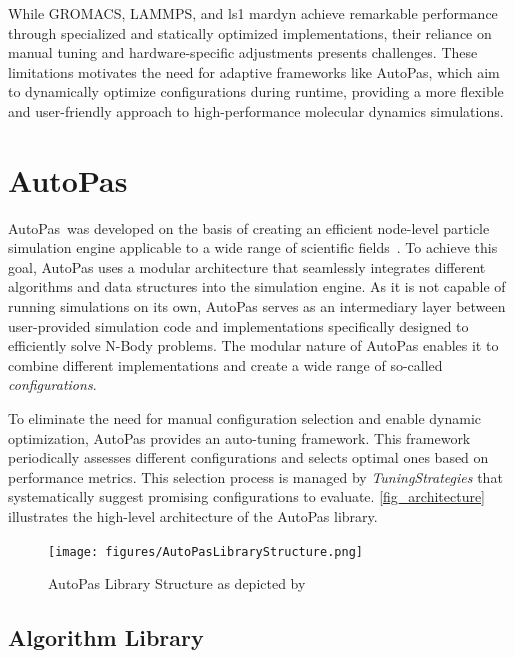 \documentclass[conference]{IEEEtran}
\begin{document}
\vspace{0.2cm}

While GROMACS, LAMMPS, and ls1 mardyn achieve remarkable performance through specialized and statically optimized implementations, their reliance on manual tuning and hardware-specific adjustments presents challenges. These limitations motivates the need for adaptive frameworks like AutoPas, which aim to dynamically optimize configurations during runtime, providing a more flexible and user-friendly approach to high-performance molecular dynamics simulations.

\section{AutoPas}

AutoPas\footnotemark\ was developed on the basis of creating an efficient node-level particle simulation engine applicable to a wide range of scientific fields~\cite{Tchipev2020}. To achieve this goal, AutoPas uses a modular architecture that seamlessly integrates different algorithms and data structures into the simulation engine. As it is not capable of running simulations on its own, AutoPas serves as an intermediary layer between user-provided simulation code and implementations specifically designed to efficiently solve N-Body problems. The modular nature of AutoPas enables it to combine different implementations and create a wide range of so-called \textit{configurations}.

To eliminate the need for manual configuration selection and enable dynamic optimization, AutoPas provides an auto-tuning framework. This framework periodically assesses different configurations and selects optimal ones based on performance metrics. This selection process is managed by \textit{TuningStrategies} that systematically suggest promising configurations to evaluate. \autoref{fig_architecture} illustrates the high-level architecture of the AutoPas library.

\begin{figure}[H]
    \centering
    \texttt{[image: figures/AutoPasLibraryStructure.png]}
    \caption{AutoPas Library Structure as depicted by~\cite{Newcome2023Poster}}
    \label{fig_architecture}
\end{figure}

\subsection{Algorithm Library}
\end{document}
